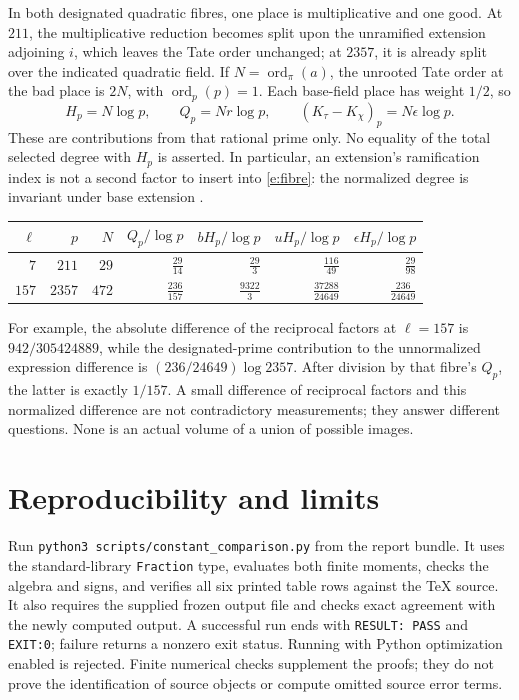 \documentclass[11pt]{article}
\theoremstyle{remark}
\newcommand{\ord}{\operatorname{ord}}
\begin{document}
In both designated quadratic fibres, one place is multiplicative and one
good.  At $211$, the multiplicative reduction becomes split upon the
unramified extension adjoining $i$, which leaves the Tate order unchanged;
at $2357$, it is already split over the indicated quadratic field.
If $N=\ord_{\pi}(a)$, the unrooted Tate order at the bad place is
$2N$, with $\ord_p(p)=1$.  Each base-field place has weight $1/2$, so
\begin{equation}\label{e:fibre}
 H_p=N\log p,\qquad Q_p=Nr\log p,\qquad
 (K_\tau-K_\chi)_p=N\epsilon\log p.
\end{equation}
These are contributions from that rational prime only.
No equality of the total selected degree with $H_p$ is asserted.
In particular, an extension's ramification index is not a second factor
to insert into \eqref{e:fibre}: the normalized degree is invariant under
base extension \cite[Def.~1.9(i), pp.~21--22]{IUT4}.

\begin{center}\small\renewcommand{\arraystretch}{1.8}\everymath{\displaystyle}
\begin{tabular}{rrrrrrr}
\toprule
$\ell$ & $p$ & $N$ & $Q_p/\log p$ & $bH_p/\log p$ & $uH_p/\log p$ & $\epsilon H_p/\log p$\\
\midrule
$7$ & $211$ & $29$ & $\frac{29}{14}$ & $\frac{29}{3}$ & $\frac{116}{49}$ & $\frac{29}{98}$ \\
$157$ & $2357$ & $472$ & $\frac{236}{157}$ & $\frac{9322}{3}$ & $\frac{37288}{24649}$ & $\frac{236}{24649}$ \\
\bottomrule
\end{tabular}
\end{center}

For example, the absolute difference of the reciprocal factors at
$\ell=157$ is $942/305424889$, while the designated-prime contribution to
the unnormalized expression difference is $(236/24649)\log2357$.
After division by that fibre's $Q_p$, the latter is exactly $1/157$.
A small difference of reciprocal factors and this normalized difference
are not contradictory measurements; they answer different questions.
None is an actual volume of a union of possible images.

\section*{Reproducibility and limits}

Run \texttt{python3 scripts/constant\_comparison.py} from the report bundle.
It uses the standard-library \texttt{Fraction} type, evaluates both finite
moments, checks the algebra and signs, and verifies all six printed table
rows against the TeX source.  It also requires the supplied frozen output
file and checks exact agreement with the newly computed output.
A successful run ends with
\texttt{RESULT: PASS} and \texttt{EXIT:0}; failure returns a nonzero exit
status.  Running with Python optimization enabled is rejected.
Finite numerical checks supplement the proofs; they do not prove the
identification of source objects or compute omitted source error terms.
\end{document}

